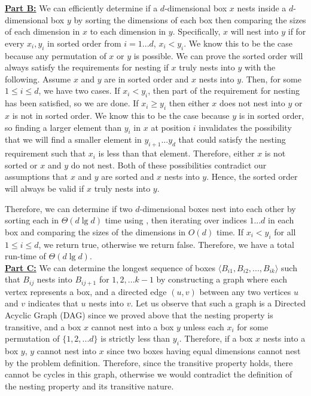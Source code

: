 \documentclass[11pt]{article}
\begin{document}
\textbf{\underline{Part B:}} We can efficiently determine if a $d$-dimensional box $x$ nests inside a $d$-dimensional box $y$ by sorting the dimensions of each box then comparing the sizes of each dimension in $x$ to each dimension in $y$. Specifically, $x$ will nest into $y$ if for every $x_i,y_i$ in sorted order from $i=1...d$, $x_i < y_i$. We know this to be the case because any permutation of $x$ or $y$ is possible. We can prove the sorted order will always satisfy the requirements for nesting if $x$ truly nests into $y$ with the following. Assume $x$ and $y$ are in sorted order and $x$ nests into $y$. Then, for some $1 \leq i \leq d$, we have two cases. If $x_i < y_i$, then part of the requirement for nesting has been satisfied, so we are done. If $x_i \geq y_i$ then either $x$ does not nest into $y$ or $x$ is not in sorted order. We know this to be the case because $y$ is in sorted order, so finding a larger element than $y_i$ in $x$ at position $i$ invalidates the possibility that we will find a smaller element in $y_{i+1}...y_d$ that could satisfy the nesting requirement such that $x_i$ is less than that element. Therefore, either $x$ is not sorted or $x$ and $y$ do not nest. Both of these possibilities contradict our assumptions that $x$ and $y$ are sorted and $x$ nests into $y$. Hence, the sorted order will always be valid if $x$ truly nests into $y$.

Therefore, we can determine if two $d$-dimensional boxes nest into each other by sorting each in $\Theta(d\lg{d})$ time using , then iterating over indices $1...d$ in each box and comparing the sizes of the dimensions in $O(d)$ time. If $x_i < y_i$ for all $1 \leq i \leq d$, we return true, otherwise we return false. Therefore, we have a total run-time of $\Theta(d\lg{d})$.\\

\textbf{\underline{Part C:}} We can determine the longest sequence of boxes $\langle B_{i1}, B_{i2}, ..., B_{ik}\rangle$ such that $B_{ij}$ nests into $B_{ij+1}$ for $1,2,...k-1$ by constructing a graph where each vertex represents a box, and a directed edge $(u,v)$ between any two vertices $u$ and $v$ indicates that $u$ nests into $v$. Let us observe that such a graph is a Directed Acyclic Graph (DAG) since we proved above that the nesting property is transitive, and a box $x$ cannot nest into a box $y$ unless each $x_i$ for some permutation of $\{1,2,...d\}$ is strictly less than $y_i$. Therefore, if a box $x$ nests into a box $y$, $y$ cannot nest into $x$ since two boxes having equal dimensions cannot nest by the problem definition. Therefore, since the transitive property holds, there cannot be cycles in this graph, otherwise we would contradict the definition of the nesting property and its transitive nature.
\end{document}
